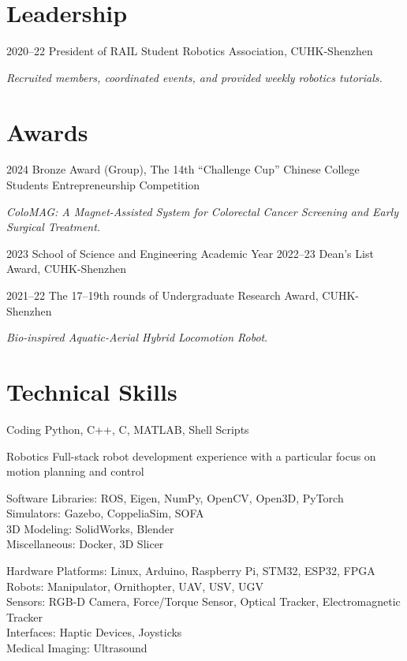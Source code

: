 \documentclass[11pt,letterpaper]{report}
\begin{document}
	
\section*{Leadership}
\begin{tablist}
	\item[2020--22]   \tab President of RAIL Student Robotics Association, CUHK-Shenzhen 
	
	\textit{Recruited members, coordinated events, and provided weekly robotics tutorials.}
\end{tablist}
	
\section*{Awards}
\begin{tablist}	
	\item[2024] \tab Bronze Award (Group), The 14th ``Challenge Cup'' Chinese College Students Entrepreneurship Competition

	\textit{ColoMAG: A Magnet-Assisted System for Colorectal Cancer Screening and Early Surgical Treatment.}	

	\item[2023]   \tab School of Science and Engineering Academic Year 2022--23 Dean's List Award, CUHK-Shenzhen
	\item[2021--22]   \tab The 17--19th rounds of  Undergraduate Research Award, CUHK-Shenzhen
	
	\textit{Bio-inspired Aquatic-Aerial Hybrid Locomotion Robot}.
\end{tablist}
	
\section*{Technical Skills}
\begin{tablist}
	\item[Coding] \tab Python, C++, C, MATLAB, Shell Scripts
	\item[Robotics] \tab Full-stack robot development experience with a particular focus on motion planning and control
	\item[Software] \tab Libraries: ROS, Eigen, NumPy, OpenCV, Open3D, PyTorch\\
	Simulators: Gazebo, CoppeliaSim, SOFA\\
	3D Modeling: SolidWorks, Blender\\
	Miscellaneous: Docker, 3D Slicer
	\item[Hardware] \tab Platforms: Linux, Arduino, Raspberry Pi, STM32, ESP32, FPGA\\
	Robots: Manipulator, Ornithopter, UAV, USV, UGV\\ 
	Sensors: RGB-D Camera, Force/Torque Sensor, Optical Tracker, Electromagnetic Tracker\\
	Interfaces: Haptic Devices, Joysticks\\
	Medical Imaging: Ultrasound
\end{tablist}
\end{document}
